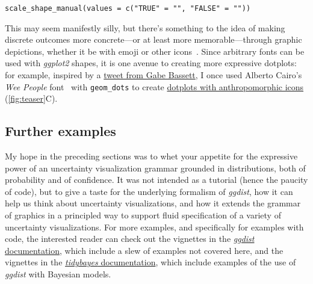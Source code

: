 \documentclass[journal]{vgtc}                     %
\begin{document}
{
\hfill\break
\small
\centering
\varwidth{\linewidth}
\noindent
\verb|scale_shape_manual(values = c("TRUE" = "|\smiley\verb|", "FALSE" = "|\frowny\verb|"))|%
\endvarwidth%
\par%
\vspace{.1\belowdisplayskip}%
\hfill\break%
}
This may seem manifestly silly, but there's something to the idea of making discrete outcomes more concrete---or at least more memorable---through graphic depictions, whether it be with emoji or other icons~\cite{haroz2015isotype}. Since arbitrary fonts can be used with \textit{ggplot2} shapes, it is one avenue to creating more expressive dotplots: for example, inspired by a \href{https://twitter.com/gdbassett/status/1519067260555513859?s=20}{tweet from Gabe Bassett}, I once used Alberto Cairo's \textit{Wee People} font~\cite{cairo2018weepeople} with \texttt{geom\_dots} to create \href{https://github.com/mjskay/uncertainty-examples/blob/master/weepeople_dotplots.md}{dotplots with anthropomorphic icons} (\cref{fig:teaser}C).



\subsection{Further examples}

My hope in the preceding sections was to whet your appetite for the expressive power of an uncertainty visualization grammar grounded in distributions, both of probability and of confidence. It was not intended as a tutorial (hence the paucity of code), but to give a taste for the underlying formalism of \textit{ggdist}, how it can help us think about uncertainty visualizations, and how it extends the grammar of graphics in a principled way to support fluid specification of a variety of uncertainty visualizations. For more examples, and specifically for examples with code, the interested reader 
can check out the vignettes in the \href{https://mjskay.github.io/ggdist/}{\textit{ggdist} documentation}, which include a slew of examples not covered here, and the vignettes in the \href{https://mjskay.github.io/tidybayes/}{\textit{tidybayes} documentation}, which include examples of the use of \textit{ggdist} with Bayesian models.
\end{document}
